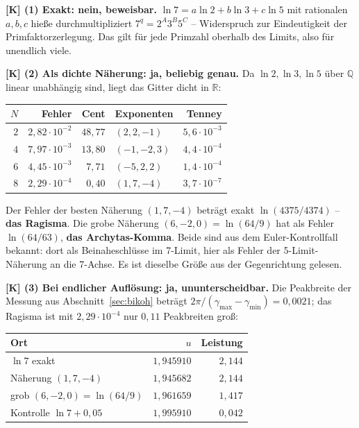 \textbf{[K] (1) Exakt: nein, beweisbar.} $\ln 7 = a\ln2 + b\ln3 +
c\ln5$ mit rationalen $a,b,c$ hie\ss e durchmultipliziert
$7^q = 2^A 3^B 5^C$ -- Widerspruch zur Eindeutigkeit der
Primfaktorzerlegung. Das gilt f\"ur jede Primzahl oberhalb des Limits,
also f\"ur unendlich viele.

\textbf{[K] (2) Als dichte N\"aherung: ja, beliebig genau.} Da
$\ln2, \ln3, \ln5$ \"uber $\mathbb{Q}$ linear unabh\"angig sind, liegt
das Gitter dicht in $\mathbb{R}$:

\begin{center}
\begin{tabular}{rrrlr}
\toprule
$N$ & Fehler & Cent & Exponenten & Tenney \\
\midrule
$2$ & $2{,}82\cdot10^{-2}$ & $48{,}77$ & $(2,2,-1)$ & $5{,}6\cdot10^{-3}$ \\
$4$ & $7{,}97\cdot10^{-3}$ & $13{,}80$ & $(-1,-2,3)$ & $4{,}4\cdot10^{-4}$ \\
$6$ & $4{,}45\cdot10^{-3}$ & $7{,}71$ & $(-5,2,2)$ & $1{,}4\cdot10^{-4}$ \\
$8$ & $2{,}29\cdot10^{-4}$ & $0{,}40$ & $(1,7,-4)$ & $3{,}7\cdot10^{-7}$ \\
\bottomrule
\end{tabular}
\end{center}

Der Fehler der besten N\"aherung $(1,7,-4)$ betr\"agt exakt
$\ln(4375/4374)$ -- \textbf{das Ragisma}. Die grobe N\"aherung
$(6,-2,0) = \ln(64/9)$ hat als Fehler $\ln(64/63)$, \textbf{das
Archytas-Komma}. Beide sind aus dem Euler-Kontrollfall bekannt: dort
als Beinaheschl\"usse im 7-Limit, hier als Fehler der
5-Limit-N\"aherung an die 7-Achse. Es ist dieselbe Gr\"o\ss e aus der
Gegenrichtung gelesen.

\textbf{[K] (3) Bei endlicher Aufl\"osung: ja, ununterscheidbar.} Die
Peakbreite der Messung aus Abschnitt~\ref{sec:bikoh} betr\"agt
$2\pi/(\gamma_{\max}-\gamma_{\min}) = 0{,}0021$; das Ragisma ist mit
$2{,}29\cdot10^{-4}$ nur $0{,}11$ Peakbreiten gro\ss{}:

\begin{center}
\begin{tabular}{lrr}
\toprule
Ort & $u$ & Leistung \\
\midrule
$\ln 7$ exakt & $1{,}945910$ & $2{,}144$ \\
N\"aherung $(1,7,-4)$ & $1{,}945682$ & $2{,}144$ \\
grob $(6,-2,0) = \ln(64/9)$ & $1{,}961659$ & $1{,}417$ \\
Kontrolle $\ln 7 + 0{,}05$ & $1{,}995910$ & $0{,}042$ \\
\bottomrule
\end{tabular}
\end{center}

